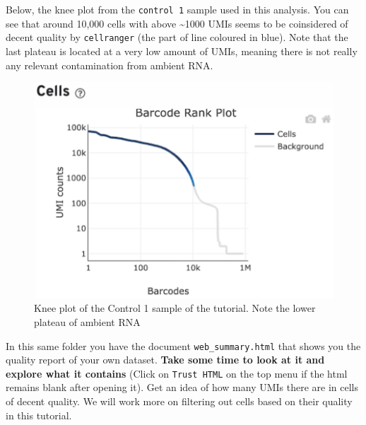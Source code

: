 \documentclass[
  letterpaper,
  DIV=11,
  numbers=noendperiod]{scrartcl}
\begin{document}
Below, the knee plot from the \texttt{control\ 1} sample used in this
analysis. You can see that around 10,000 cells with above
\textasciitilde1000 UMIs seems to be coinsidered of decent quality by
\texttt{cellranger} (the part of line coloured in blue). Note that the
last plateau is located at a very low amount of UMIs, meaning there is
not really any relevant contamination from ambient RNA.

\begin{figure}

{\centering \includegraphics[width=6.25in,height=\textheight]{images/knee.png}

}

\caption{\label{fig-knee}Knee plot of the Control 1 sample of the
tutorial. Note the lower plateau of ambient RNA}

\end{figure}

\begin{tcolorbox}[enhanced jigsaw, arc=.35mm, toprule=.15mm, breakable, bottomrule=.15mm, title={Exercise}, opacityback=0, colframe=quarto-callout-note-color-frame, opacitybacktitle=0.6, leftrule=.75mm, titlerule=0mm, left=2mm, bottomtitle=1mm, toptitle=1mm, colback=white, rightrule=.15mm, colbacktitle=quarto-callout-note-color!10!white, coltitle=black]

In this same folder you have the document \texttt{web\_summary.html}
that shows you the quality report of your own dataset. \textbf{Take some
time to look at it and explore what it contains} (Click on
\texttt{Trust\ HTML} on the top menu if the html remains blank after
opening it). Get an idea of how many UMIs there are in cells of decent
quality. We will work more on filtering out cells based on their quality
in this tutorial.

\end{tcolorbox}
\end{document}
